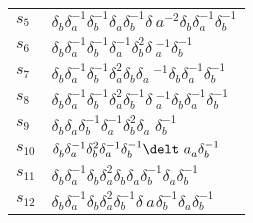 \documentclass{article}
\begin{document}
\begin{center}
\begin{tabular}{ll}
$s_{5}$ & $\delta_b^{}\delta_a^{-1}\delta_b^{-1}\delta_a^{}\delta_b^{-1}\delta_\
a^{-2}\delta_b^{}\delta_a^{-1}\delta_b^{-1}$ \\
$s_{6}$ & $\delta_b^{}\delta_a^{-1}\delta_b^{-1}\delta_a^{-1}\delta_b^{2}\delta\
_a^{-1}\delta_b^{-1}$ \\
$s_{7}$ & $\delta_b^{}\delta_a^{-1}\delta_b^{-1}\delta_a^{2}\delta_b^{}\delta_a\
^{-1}\delta_b^{}\delta_a^{-1}\delta_b^{-1}$ \\
$s_{8}$ & $\delta_b^{}\delta_a^{-1}\delta_b^{-1}\delta_a^{2}\delta_b^{-1}\delta\
_a^{-1}\delta_b^{}\delta_a^{-1}\delta_b^{-1}$ \\
$s_{9}$ & $\delta_b^{}\delta_a^{}\delta_b^{-1}\delta_a^{-1}\delta_b^{2}\delta_a\
^{}\delta_b^{-1}$ \\
$s_{10}$ & $\delta_b^{}\delta_a^{-1}\delta_b^{2}\delta_a^{-1}\delta_b^{-1}\delt\
a_a^{}\delta_b^{-1}$ \\
$s_{11}$ & $\delta_b^{}\delta_a^{-1}\delta_b^{}\delta_a^{2}\delta_b^{}\delta_a^\
{}\delta_b^{-1}\delta_a^{}\delta_b^{-1}$ \\
$s_{12}$ & $\delta_b^{}\delta_a^{-1}\delta_b^{}\delta_a^{2}\delta_b^{-1}\delta_\
a^{}\delta_b^{-1}\delta_a^{}\delta_b^{-1}$ \\
\bottomrule
\end{tabular}
\end{center}

\thispagestyle{empty}
\end{document}
